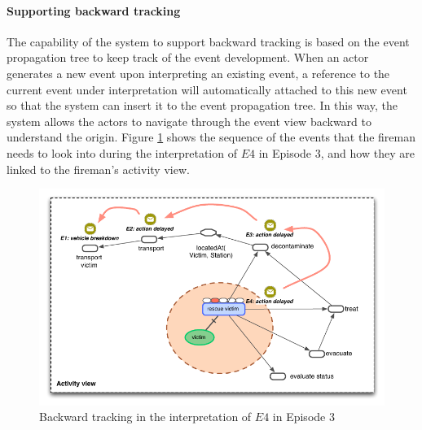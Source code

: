 \paragraph*{Supporting backward tracking} %
\label{par:supporting_backward_tracking}
The capability of the system to support backward tracking is based on the event propagation tree to keep track of the event development. When an actor generates a new event upon interpreting an existing event, a reference to the current event under interpretation will automatically attached to this new event so that the system can insert it to the event propagation tree. In this way, the system allows the actors to navigate through the event view backward to understand the origin. Figure \ref{fig:backward_chain} shows the sequence of the events that the fireman needs to look into during the interpretation of $E4$ in Episode 3, and how they are linked to the fireman's activity view. 

\begin{figure}[htbp] %
	\centering
	\includegraphics{backward_chain.pdf} 
	\caption{Backward tracking in the interpretation of $E4$ in Episode 3}
	\label{fig:backward_chain}
\end{figure}

